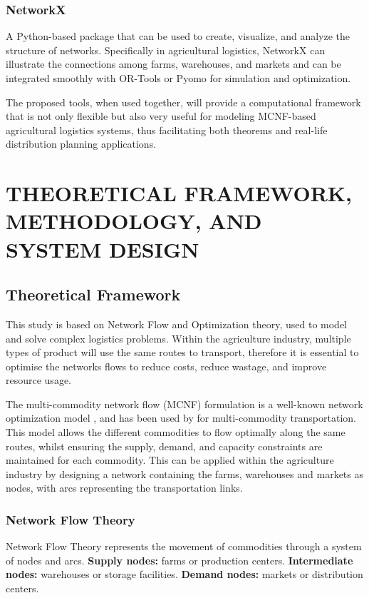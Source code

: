 \documentclass{icsthesis}
\begin{document}
\begin{mainmatter}
\subsubsection{NetworkX}
A Python-based package that can be used to create, visualize, and analyze the structure of networks. Specifically in agricultural logistics, NetworkX can illustrate the connections among farms, warehouses, and markets and can be integrated smoothly with OR-Tools or Pyomo for simulation and optimization.



The proposed tools, when used together, will provide a computational framework that is not only flexible but also very useful for modeling MCNF-based agricultural logistics systems, thus facilitating both theorems and real-life distribution planning applications.


\section{THEORETICAL FRAMEWORK, METHODOLOGY, AND SYSTEM DESIGN}

\subsection{Theoretical Framework}
This study is based on Network Flow and Optimization theory, used to model and solve complex logistics problems. Within the agriculture industry, multiple types of product will use the same routes to transport, therefore it is essential to optimise the networks flows to reduce costs, reduce wastage, and improve resource usage.

The multi-commodity network flow (MCNF) formulation is a well-known network optimization model \citep{ahuja1993}, and has been used by \citet{rodrigo2018} for multi-commodity transportation. This model allows the different commodities to flow optimally along the same routes, whilst ensuring the supply, demand, and capacity constraints are maintained for each commodity. This can be applied within the agriculture industry by designing a network containing the farms, warehouses and markets as nodes, with arcs representing the transportation links.


\subsubsection{Network Flow Theory}
Network Flow Theory represents the movement of commodities through a system of nodes and arcs.
\textbf{Supply nodes:} farms or production centers.
\textbf{Intermediate nodes:} warehouses or storage facilities.
\textbf{Demand nodes:} markets or distribution centers.


\end{mainmatter}
\end{document}
